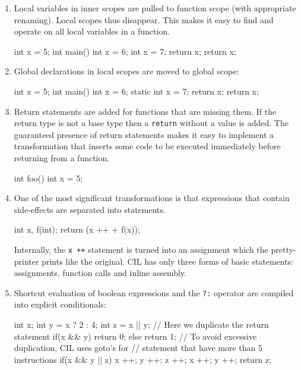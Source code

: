 \documentclass[letterpaper]{article}
\def\t#1{{\tt #1}}
\begin{document}
\begin{enumerate}
\begin{cilcode}[local]
  int x = 5;
  struct foo { int f1, f2; } a [] = {1, 2, 3, 4, 5 };
\end{cilcode}

\item Local variables in inner scopes are pulled to function scope (with
appropriate renaming). Local scopes thus disappear. This makes it easy to find
and operate on all local variables in a function.

\begin{cilcode}[global]
  int x = 5;
  int main() {
    int x = 6;
    {
      int x = 7;
      return x;
    }
    return x;
  }
\end{cilcode}

\item Global declarations in local scopes are moved to global scope:
\begin{cilcode}[global]
  int x = 5;
  int main() {
    int x = 6;
    {
      static int x = 7;
      return x;
    }
    return x;
  }
\end{cilcode}

\item Return statements are added for functions that are missing them. If the
return type is not a base type then a \t{return} without a value is added.
The guaranteed presence of return statements makes it easy to implement a
transformation that inserts some code to be executed immediately before
returning from a function.
\begin{cilcode}[global]
  int foo() {
    int x = 5;
  }
\end{cilcode}

\item One of the most significant transformations is that expressions that
contain side-effects are separated into statements.

\begin{cilcode}[local]
   int x, f(int);
   return (x ++ + f(x));
\end{cilcode}

 Internally, the \t{x ++} statement is turned into an assignment which the
pretty-printer prints like the original. CIL has only three forms of basic
statements: assignments, function calls and inline assembly.

\item Shortcut evaluation of boolean expressions and the \t{?:} operator are
compiled into explicit conditionals:
\begin{cilcode}[local]
  int x;
  int y = x ? 2 : 4;
  int z = x || y;
  // Here we duplicate the return statement
  if(x && y) { return 0; } else { return 1; }
  // To avoid excessive duplication, CIL uses goto's for
  // statement that have more than 5 instructions
  if(x && y || z) { x ++; y ++; z ++; x ++; y ++; return z; }
\end{cilcode}


\end{enumerate}
\end{document}
